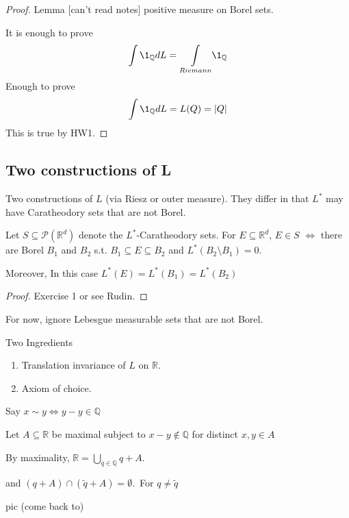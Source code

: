 \begin{proof}
	Lemma [can't read notes] positive measure on Borel sets.

	It is enough to prove 
	\begin{align*}
	\int \1_{\mathbb{Q}} dL = \underset{Riemann}{\int} \1_{\mathbb{Q}}
	\end{align*} Enough to prove
	\begin{align*}
		\int \1_{\mathbb{Q}} dL = L(Q) = |Q|
	\end{align*} 
	This is true by HW1.
\end{proof}

\subsection{Two constructions of L}

	Two constructions of $L$ (via Riesz or outer measure). They differ in that $L^*$ may have Caratheodory sets that are not Borel.

\begin{theorem}
	Let $S \subseteq \mathcal{P}(\mathbb{R}^d)$ denote the $L^*$-Caratheodory sets. For $E \subseteq 
	\mathbb{R}^d$, $E \in S$ $\iff$ there are Borel $B_1$ and $B_2$ s.t. $B_1 \subseteq E \subseteq B_2$ and
	$L^*(B_2 \setminus B_1) = 0$.

	Moreover, In this case  $L^*(E) = L^*(B_1) = L^*(B_2)$
\end{theorem}
\begin{proof}
	Exercise 1 or see Rudin.
\end{proof}

For now, ignore Lebesgue measurable sets that are not Borel.

\begin{example}
	Two Ingredients
	\begin{enumerate}
		\item Translation invariance of $L$ on $\mathbb{R}$.
		\item Axiom of choice.
	\end{enumerate}

	Say $x \sim y \iff y - y \in  \mathbb{Q}$

	Let $A \subseteq \mathbb{R}$ be maximal subject to $x - y \notin \mathbb{Q}$ for distinct $x,y \in A$

	By maximality,  $\mathbb{R} = \bigcup_{q \in \mathbb{Q}} q + A$.

	and $(q + A) \cap (\tilde{q} + A) = \emptyset$.\,  For $q \neq \tilde{q}$
\end{example}
pic (come back to)

